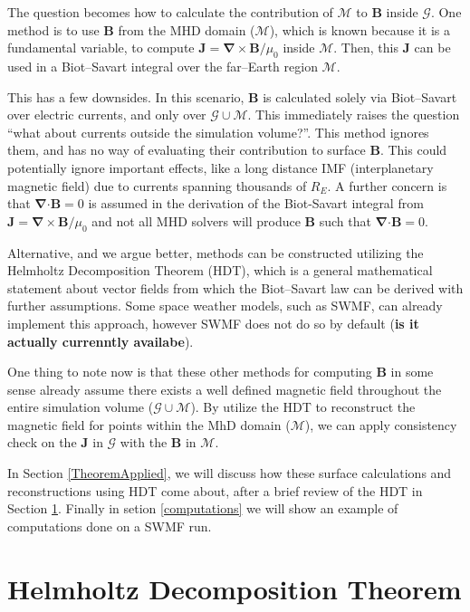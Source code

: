 \documentclass{article}
\newcommand\B{\mathbf{B}}
\newcommand\J{\mathbf{J}}
\newcommand\M{\mathcal{M}}
\newcommand\G{\mathcal{G}}
\begin{document}
The question becomes how to calculate the contribution of $\mathcal{M}$ to $\mathbf{B}$ inside $\G$.
One method is to use $\mathbf{B}$ from the MHD domain ($\mathcal{M}$), which is known because it is a fundamental variable,
to compute $\mathbf{J} = \boldsymbol{\nabla} \times \mathbf{B}/\mu_0$ inside $\mathcal{M}$.
Then, this $\J$ can be used in a Biot--Savart integral over the far--Earth region $\mathcal{M}$.

This has a few downsides.
In this scenario, $\mathbf{B}$ is calculated solely via Biot--Savart over electric currents,
and only over $\mathcal{G} \cup \mathcal{M}$.
This immediately raises the question
``what about currents outside the simulation volume?''.
This method ignores them, and has no way of evaluating their contribution to surface $\B$.
This could potentially ignore important effects,
like a long distance IMF (interplanetary magnetic field)
due to currents spanning thousands of $R_E$.
A further concern is that $\boldsymbol{\nabla} \boldsymbol{\cdot} \B = 0$ is assumed in the derivation of the Biot-Savart integral from $\mathbf{J} = \boldsymbol{\nabla} \times \mathbf{B}/\mu_0$ and not all MHD solvers will produce $\B$ such that $\boldsymbol{\nabla} \boldsymbol{\cdot} \B = 0$.

Alternative, and we argue better,
methods can be constructed utilizing the Helmholtz Decomposition Theorem (HDT),
which is a general mathematical statement about vector fields from which the Biot--Savart law can be derived with further assumptions.
Some space weather models, such as SWMF, can already implement this approach,
however SWMF does not do so by default (\textbf{is it actually currenntly availabe}).

One thing to note now is that
these other methods for computing $\B$ in some sense already assume there exists a well defined magnetic field throughout the entire simulation volume ($\G \cup \M$).
By utilize the HDT to reconstruct the magnetic field for points within the MhD domain ($\M$), we can apply consistency check on the $\J$ in $\G$ with the $\B$ in $\M$.

In Section \ref{TheoremApplied}, we will discuss how these surface calculations and reconstructions using HDT come about,
after a brief review of the HDT in Section \ref{Theorem}.
Finally in setion \ref{computations} we will show an example of computations done on a SWMF run.

\section{Helmholtz Decomposition Theorem} \label{Theorem}
\end{document}
